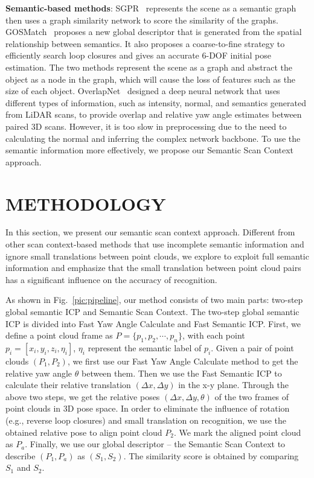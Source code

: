 \documentclass[letterpaper, 10 pt, conference]{ieeeconf}
\begin{document}
\textbf{Semantic-based methods}: SGPR~\cite{SGPR} represents the scene as a semantic graph then uses a graph similarity network to score the similarity of the graphs. GOSMatch~\cite{gosmatch} proposes a new global descriptor that is generated from the spatial relationship between semantics. It also proposes a coarse-to-fine strategy to efficiently search loop closures and gives an accurate 6-DOF initial pose estimation. The two methods represent the scene as a graph and abstract the object as a node in the graph, which will cause the loss of features such as the size of each object. OverlapNet~\cite{ON} designed a deep neural network that uses different types of information, such as intensity, normal, and semantics generated from LiDAR scans, to provide overlap and relative yaw angle estimates between paired 3D scans. However, it is too slow in preprocessing due to the need to calculating the normal and inferring the complex network backbone. To use the semantic information more effectively, we propose our Semantic Scan Context approach.



\section{METHODOLOGY}

In this section, we present our semantic scan context approach. Different from other scan context-based methods that use incomplete semantic information and ignore small translations between point clouds, we explore to exploit full semantic information and emphasize that the small translation between point cloud pairs has a significant influence on the accuracy of recognition.


As shown in Fig.~\ref{pic:pipeline}, our method consists of two main parts: two-step global semantic ICP and Semantic Scan Context. The two-step global semantic ICP is divided into Fast Yaw Angle Calculate and Fast Semantic ICP. First, we define a point cloud frame as \( P=\{ p_1,p_2,\cdots,p_n\}\), with each point \( p_i=[x_i,y_i,z_i,\eta_i]\), \(\eta_i\) represent the semantic label of \(p_i\). Given a pair of point clouds \( (P_1, P_2)\), we first use our Fast Yaw Angle Calculate method to get the relative yaw angle \( \theta \) between them. Then we use the Fast Semantic ICP to calculate their relative translation \( (\Delta x, \Delta y)\) in the x-y plane. Through the above two steps, we get the relative poses \( (\Delta x, \Delta y, \theta)\) of the two frames of point clouds in 3D pose space. In order to eliminate the influence of rotation (e.g., reverse loop closures) and small translation on recognition, we use the obtained relative pose to align point cloud \( P_2\). We mark the aligned point cloud as \(P_{a}\). Finally, we use our global descriptor -- the Semantic Scan Context to describe \( (P_1, P_{a})\) as \( (S_1, S_2)\). The similarity score is obtained by comparing \( S_1\) and \(S_2\).
\end{document}
